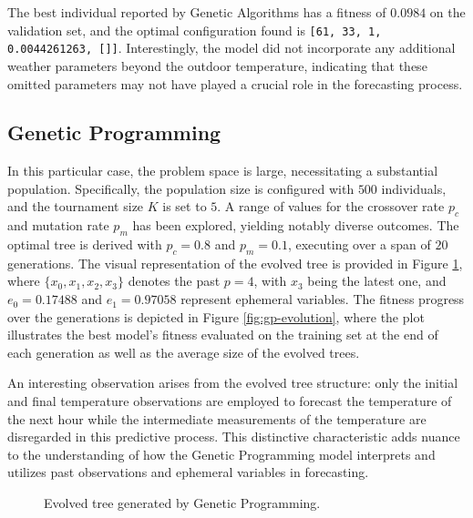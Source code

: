 The best individual reported by Genetic Algorithms has a fitness of $0.0984$ on the validation set, and the optimal configuration found is \verb|[61, 33, 1, 0.0044261263, []]|. Interestingly, the model did not incorporate any additional weather parameters beyond the outdoor temperature, indicating that these omitted parameters may not have played a crucial role in the forecasting process.

\subsection{Genetic Programming}

In this particular case, the problem space is large, necessitating a substantial population. Specifically, the population size is configured with $500$ individuals, and the tournament size $K$ is set to $5$. A range of values for the crossover rate $p_c$ and mutation rate $p_m$ has been explored, yielding notably diverse outcomes. The optimal tree is derived with $p_c=0.8$ and $p_m=0.1$, executing over a span of $20$ generations. The visual representation of the evolved tree is provided in Figure \ref{fig:gp-tree}, where $\{x_0, x_1, x_2, x_3\}$ denotes the past $p=4$, with $x_3$ being the latest one, and $e_0=0.17488$ and $e_1=0.97058$ represent ephemeral variables. The fitness progress over the generations is depicted in Figure \ref{fig:gp-evolution}, where the plot illustrates the best model’s fitness evaluated
on the training set at the end of each generation as well as the average size of the evolved trees.

An interesting observation arises from the evolved tree structure: only the initial and final temperature observations are employed to forecast the temperature of the next hour while the intermediate measurements of the temperature are disregarded in this predictive process. This distinctive characteristic adds nuance to the understanding of how the Genetic Programming model interprets and utilizes past observations and ephemeral variables in forecasting.

\begin{figure}[h]
\centering
\caption{Evolved tree generated by Genetic Programming.} 
\label{fig:gp-tree}
\end{figure}


